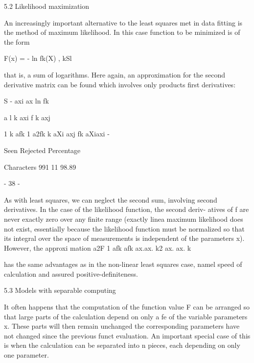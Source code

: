  
5.2  Likelihood maximization
 
     An increasingly important alternative to the least squares met
in data fitting is the method of maximum likelihood.  In this case
function to be minimized is of the form
 
 
 
                          F(x) = -  ln fk(X) ,
                                       kSl
 
 
that is, a sum of logarithms.  Here again, an approximation for the
second derivative matrix can be found which involves only products
first derivatives:
 
 
                        S - axi ax   ln fk
 
 
 
                         a l k
                        axi  f k axj
 
 
 
                            1 k afk 1 a2fk
                            k aXi axj     fk aXiaxi  -
 
                 Seen Rejected  Percentage
 
Characters        991       11   98.89
 
                                - 38 -
 
 
As with least squares, we can neglect the second sum, involving second
derivatives.  In the case of the likelihood function, the second deriv-
atives of f are never exactly zero over any finite range (exactly linea
maximum likelihood does not exist, essentially because the likelihood
function must be normalized so that its integral over the space of
measurements is independent of the parameters x).  However, the approxi
mation
a2F        1 afk afk
                         ax.ax.  k2 ax. ax.
                                   k
 
 
has the same advantages as in the non-linear least squares case, namel
speed of calculation and assured positive-definiteness.
 
 
5.3  Models with separable computing
 
     It often happens that the computation of the function value F can
be arranged so that large parts of the calculation depend on only a fe
of the variable parameters x.  These parts will then remain unchanged
the corresponding parameters have not changed since the previous funct
evaluation.  An important special case of this is when the calculation
can be separated into n pieces, each depending on only one parameter.
 
